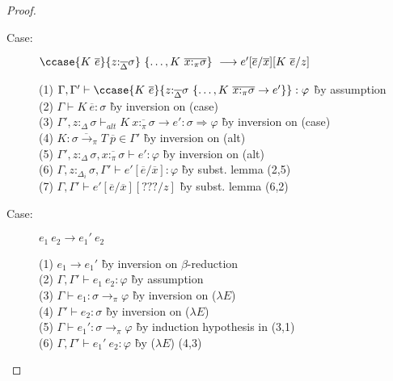 \begin{proof}
\begin{description}
\item[Case:] $\ccase{K~\overline{e}}{z{:}_{\overline{\Delta}}\sigma}~\{\dots,K~\overline{x{:}_\pi\sigma}\}\ \longrightarrow e'[\overline{e}/\overline{x}][K~\overline{e}/z]$
\begin{tabbing}
(1) $\Gamma,\Gamma' \vdash \ccase{K~\overline{e}}{z{:}_{\overline{\Delta}}\sigma~\{\dots,K~\overline{x{:}_\pi\sigma}\to e'\}} : \varphi$ \` by assumption \\
(2) $\Gamma \vdash K~\overline{e} : \sigma$ \` by inversion on (case) \\
(3) $\Gamma', z{:}_\Delta\sigma \vdash_{alt} K~\overline{x{:}_\pi\sigma} \to e' : \sigma \Longrightarrow \varphi$ \` by inversion on (case) \\
(4) $K : \overline{\sigma \to_\pi} T~\overline{p} \in \Gamma'$ \` by inversion on (alt) \\
(5) $\Gamma',z{:}_\Delta\sigma,\overline{x{:}_\pi\sigma} \vdash e' : \varphi$ \` by inversion on (alt) \\
(6) $\Gamma, z{:}_{\Delta_i}\sigma, \Gamma' \vdash e'[\overline{e}/\overline{x}] : \varphi$ \` by subst. lemma (2,5) \\
(7) $\Gamma, \Gamma' \vdash e'[\overline{e}/\overline{x}][???/z]$ \` by subst. lemma (6,2) \\
\end{tabbing}

\item[Case:] $e_1~e_2 \longrightarrow e_1'~e_2$
\begin{tabbing}
(1) $e_1 \longrightarrow e_1'$ \` by inversion on $\beta$-reduction \\
(2) $\Gamma,\Gamma' \vdash e_1~e_2 : \varphi$ \` by assumption \\
(3) $\Gamma \vdash e_1 : \sigma \to_\pi \varphi$ \` by inversion on ($\lambda E$) \\
(4) $\Gamma' \vdash e_2 : \sigma$ \` by inversion on ($\lambda E$) \\
(5) $\Gamma \vdash e_1' : \sigma \to_\pi \varphi$ \` by induction hypothesis in (3,1) \\
(6) $\Gamma, \Gamma' \vdash e_1'~e_2 : \varphi$ \` by ($\lambda E$) (4,3) \\
\end{tabbing}


\end{description}
\end{proof}
